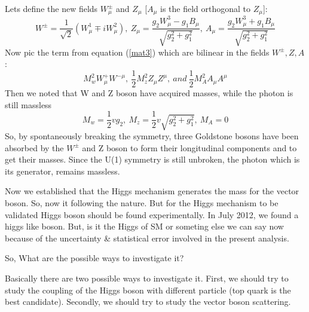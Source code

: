 Lets define the new fields $W^{\pm}_\mu$ and $Z_\mu$ [$A_\mu$ is the field orthogonal to $Z_\mu$]:
\begin{equation}
	W^{\pm}=\frac{1}{\sqrt{2}}(W^1_\mu \mp iW^2_\mu),~Z_\mu=\frac{g_2W^3_\mu-g_1B_\mu}{\sqrt{g^2_2+g^2_1}},~A_\mu=\frac{g_2W^3_\mu+g_1B_\mu}{\sqrt{g^2_2+g^2_1}}
\end{equation}
Now pic the term from equation (\ref{mat3}) which are bilinear in the fields $W^\pm,Z,A$:
	\begin{equation}
	M^2_wW^+_\mu W^{-\mu},~\frac{1}{2}M^2_z Z_\mu Z^\mu,~and~\frac{1}{2}M^2_AA_\mu A^\mu
	\end{equation}
Then we noted that W and Z boson have acquired masses, while the photon is still massless
	\begin{equation}
	M_w=\frac{1}{2}vg_2,~M_z=\frac{1}{2}v\sqrt{g^2_2+g^2_1},~M_A=0
	\end{equation}
So, by spontaneously breaking the symmetry, three Goldstone bosons have been absorbed by the $W^\pm$ and Z boson to form their longitudinal components and to get their masses. Since the U(1) symmetry is still unbroken, the photon which is its generator, remains massless.


Now we established that the Higgs mechanism generates the mass for the vector boson. So, now it following the nature. But for the Higgs mechanism to be validated Higgs boson should be found experimentally. In July 2012, we found a higgs like boson. But, is it the Higgs of SM or someting else we can say now because of the uncertainty \& statistical error involved in the present analysis. 

So, What are the possible ways to investigate it?

Basically there are two possible ways to investigate it. First, we should try to study the coupling of the Higgs boson with different particle (top quark is the best candidate). Secondly, we should try to study the vector boson scattering.
